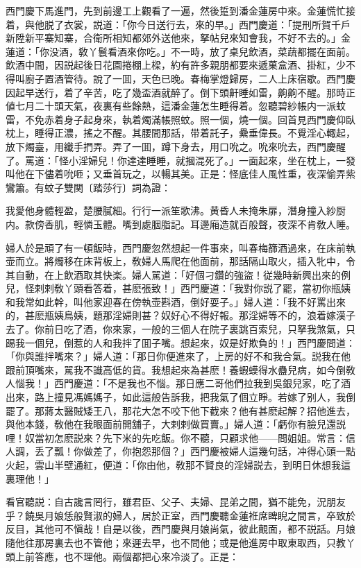 西門慶下馬進門，先到前邊工上觀看了一遍，然後踅到潘金蓮房中來。金蓮慌忙接着，與他脱了衣裳，説道：「你今日送行去，來的早。」西門慶道：「提刑所賀千戶新陞新平寨知寨，合衛所相知都郊外送他來，拏帖兒來知會我，不好不去的。」金蓮道：「你没酒，敎丫鬟看酒來你吃。」不一時，放了桌兒飲酒，菜蔬都擺在面前。飲酒中間，因説起後日花園捲棚上樑，約有許多親朋都要來遞菓盒酒、掛紅，少不得叫廚子置酒管待。說了一囬，天色已晚。春梅掌燈歸房，二人上床宿歇。西門慶因起早送行，着了辛苦，吃了幾盃酒就醉了。倒下頭鼾睡如雷，齁齁不醒。那時正値七月二十頭天氣，夜裏有些餘熱，這潘金蓮怎生睡得着。忽聽碧紗帳内一派蚊雷，不免赤着身子起身來，執着燭滿帳照蚊。照一個，燒一個。回首見西門慶仰臥枕上，睡得正濃，搖之不醒。其腰間那話，带着託子，纍垂偉長。不覺淫心輙起，放下燭臺，用纖手捫弄。弄了一囬，蹲下身去，用口吮之。吮來吮去，西門慶醒了。罵道：「怪小淫婦兒！你達達睡睡，就摑混死了。」一面起來，坐在枕上，一發叫他在下儘着吮咂；又垂首玩之，以暢其美。正是：怪底佳人風性重，夜深偷弄紫鸞簫。有蚊子雙関〔踏莎行〕詞為證：

\begin{myquote}
我愛他身體輕盈，楚腰膩細。行行一派笙歌沸。黄昏人未掩朱扉，潛身撞入紗厨内。款傍香肌，輕憐玉體。嘴到處胭脂記。耳邊廂造就百般聲，夜深不肯敎人睡。
\end{myquote}

婦人於是頑了有一頓飯時，西門慶忽然想起一件事來，叫春梅篩酒過來，在床前執壶而立。將燭移在床背板上，敎婦人馬爬在他面前，那話隔山取火，插入牝中，令其自動，在上飲酒取其快楽。婦人駡道：「好個刁鑽的強盜！従幾時新興出來的例兒，怪剌剌敎丫頭看答着，甚麽張致！」西門慶道：「我對你説了罷，當初你瓶姨和我常如此幹，叫他家迎春在傍執壶斟酒，倒好耍子。」婦人道：「我不好罵出來的，甚麽瓶姨鳥姨，題那淫婦則甚？奴好心不得好報。那淫婦等不的，浪着嫁漢子去了。你前日吃了酒，你來家，一般的三個人在院子裏跳百索兒，只拏我煞氣，只踢我一個兒，倒惹的人和我拌了囬子嘴。想起來，奴是好欺負的！」西門慶問道：「你與誰拌嘴來？」婦人道：「那日你便進來了，上房的好不和我合氣。説我在他跟前頂嘴來，駡我不識高低的貨。我想起來為甚麽！養蝦蟆得水蠱兒病，如今倒敎人惱我！」西門慶道：「不是我也不惱。那日應二哥他們拉我到吳銀兒家，吃了酒出來，路上撞見馮媽媽子，如此這般告訴我，把我氣了個立睜。若嫁了别人，我倒罷了。那蔣太醫賊矮王八，那花大怎不咬下他下截來？他有甚麽起解？招他進去，與他本錢，敎他在我眼面前開舖子，大剌剌做買賣。」婦人道：「虧你有臉兒還説哩！奴當初怎麽説來？先下米的先吃飯。你不聽，只顧求他——問姐姐。常言：信人調，丢了瓢！你做差了，你抱怨那個？」西門慶被婦人這幾句話，冲得心頭一點火起，雲山半壁通紅，便道：「你由他，敎那不賢良的淫婦説去，到明日休想我這裏理他！」

看官聽説：自古讒言罔行，雖君臣、父子、夫婦、昆弟之間，猶不能免，況朋友乎？饒吳月娘恁般賢淑的婦人，居於正室，西門慶聽金蓮袵席睥睨之間言，卒致於反目，其他可不愼哉！自是以後，西門慶與月娘尚氣，彼此覿面，都不説話。月娘隨他往那房裏去也不管他；來遲去早，也不問他；或是他進房中取東取西，只教丫頭上前答應，也不理他。兩個都把心來冷淡了。正是：

